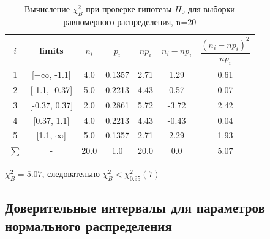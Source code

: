 \begin{table}[H]
	\begin{center}
		\begin{tabular}{|c|c|c|c|c|c|c|}
			\hline
			$i$ & limits & $n_i$ & $p_i$ & $np_i$ & $n_i - np_i$ & $\dfrac{(n_i-np_i)^2}{np_i}$ \\
			\hline
			1 & [$-\infty$, -1.1] & 4.0 & 0.1357 & 2.71 & 1.29 & 0.61 \\
			2 & [-1.1, -0.37] & 5.0 & 0.2213 & 4.43 & 0.57 & 0.07 \\
			3 & [-0.37, 0.37] & 2.0 & 0.2861 & 5.72 & -3.72 & 2.42 \\
			4 & [0.37, 1.1] & 4.0 & 0.2213 & 4.43 & -0.43 & 0.04 \\
			5 & [1.1, $\infty$] & 5.0 & 0.1357 & 2.71 & 2.29 & 1.93 \\
			\hline
			$\sum$ & - & 20.0 & 1.0 & 20.0 & 0.0 & 5.07\\
			\hline
		\end{tabular}
	\end{center}
	\caption{Вычисление $\chi_{B}^2$ при проверке гипотезы $H_0$ для выборки равномерного распределения, n=20}
\end{table} 

$\chi_{B}^2 = 5.07$, следовательно  $\chi_{B}^2 <\chi^{2}_{0.95}(7)$ \\

\subsection{Доверительные интервалы для параметров нормального распределения}

